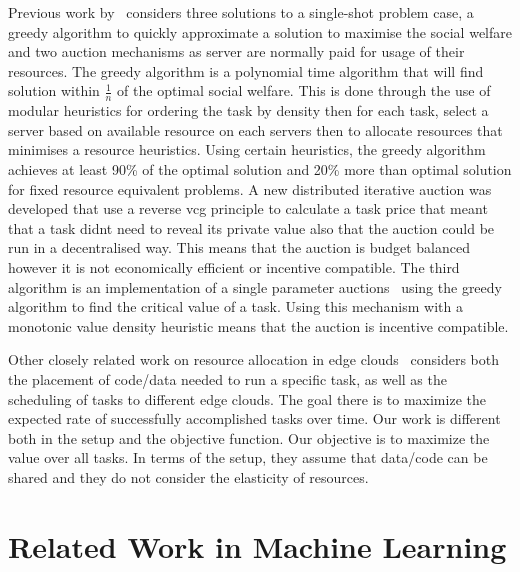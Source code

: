 Previous work by~\cite{FlexibleResourceAllocation} considers three solutions to a single-shot problem case,
a greedy algorithm to quickly approximate a solution to maximise the social welfare and two auction mechanisms as server
are normally paid for usage of their resources. The greedy algorithm is a polynomial time algorithm that will find solution
within $\frac{1}{n}$ of the optimal social welfare.
This is done through the use of modular heuristics for ordering the task by density then for each task, select a server
based on available resource on each servers then to allocate resources that minimises a resource heuristics.
Using certain heuristics, the greedy algorithm achieves at least 90\% of the optimal solution and 20\% more than optimal
solution for fixed resource equivalent problems. A new distributed iterative auction was developed that use a reverse vcg
principle to calculate a task price that meant that a task didnt need to reveal its private value also that the
auction could be run in a decentralised way. This means that the auction is budget balanced however it is not
economically efficient or incentive compatible. The third algorithm is an implementation of a single parameter
auctions~\citep{nisan2007algorithmic_critical_value} using the greedy algorithm to find the critical value of a task.
Using this mechanism with a monotonic value density heuristic means that the auction is incentive compatible.

Other closely related work on resource allocation in edge clouds~\cite{vaji_infocom} considers both the placement of
code/data needed to run a specific task, as well as the scheduling of tasks to different edge clouds. The goal there
is to maximize the expected rate of successfully accomplished tasks over time. Our work is different both in the setup
and the objective function. Our objective is to maximize the value over all tasks. In terms of the setup, they assume
that data/code can be shared and they do not consider the elasticity of resources.

\section{Related Work in Machine Learning}\label{sec:related-work-in-machine-learning}  %